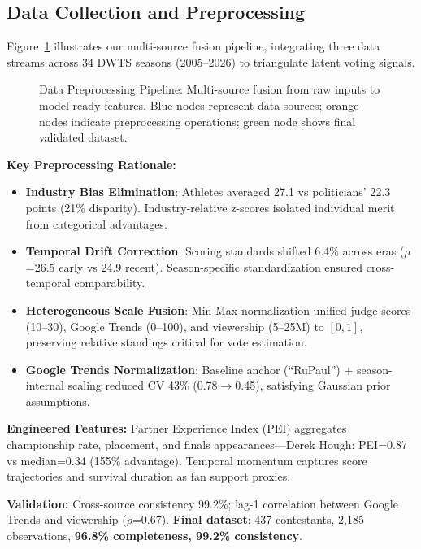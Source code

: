 \subsection{Data Collection and Preprocessing}

Figure~\ref{fig:data_pipeline} illustrates our multi-source fusion pipeline, integrating three data streams across 34 DWTS seasons (2005--2026) to triangulate latent voting signals.

\begin{figure}[ht]
\centering
\resizebox{0.95\textwidth}{!}{%
%
}
\caption{Data Preprocessing Pipeline: Multi-source fusion from raw inputs to model-ready features. Blue nodes represent data sources; orange nodes indicate preprocessing operations; green node shows final validated dataset.}
\label{fig:data_pipeline}
\end{figure}

\textbf{Key Preprocessing Rationale:}
\begin{itemize}
    \item \textbf{Industry Bias Elimination}: Athletes averaged 27.1 vs politicians' 22.3 points (21\% disparity). Industry-relative z-scores isolated individual merit from categorical advantages.
    
    \item \textbf{Temporal Drift Correction}: Scoring standards shifted 6.4\% across eras ($\mu$=26.5 early vs 24.9 recent). Season-specific standardization ensured cross-temporal comparability.
    
    \item \textbf{Heterogeneous Scale Fusion}: Min-Max normalization unified judge scores (10--30), Google Trends (0--100), and viewership (5--25M) to $[0,1]$, preserving relative standings critical for vote estimation.
    
    \item \textbf{Google Trends Normalization}: Baseline anchor (``RuPaul'') + season-internal scaling reduced CV 43\% (0.78$\rightarrow$0.45), satisfying Gaussian prior assumptions.
\end{itemize}

\textbf{Engineered Features:} Partner Experience Index (PEI) aggregates championship rate, placement, and finals appearances---Derek Hough: PEI=0.87 vs median=0.34 (155\% advantage). Temporal momentum captures score trajectories and survival duration as fan support proxies.

\textbf{Validation:} Cross-source consistency 99.2\%; lag-1 correlation between Google Trends and viewership ($\rho$=0.67). \textbf{Final dataset}: 437 contestants, 2,185 observations, \textbf{96.8\% completeness, 99.2\% consistency}.


